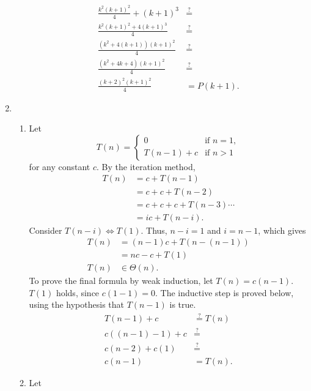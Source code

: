 \documentclass[12pt]{article}
\begin{document}
\begin{enumerate}
\begin{enumerate}
\begin{align*}
            \frac{k^{2} (k + 1)^{2}}{4} + (k + 1)^{3} &\stackrel{?}{=} \\
            \frac{k^{2} (k + 1)^{2} + 4(k + 1)^{3}}{4} &\stackrel{?}{=} \\
            \frac{(k^{2} + 4(k + 1))(k + 1)^{2}}{4} &\stackrel{?}{=} \\
            \frac{(k^{2} + 4k + 4)(k + 1)^{2}}{4} &\stackrel{?}{=} \\
            \frac{(k + 2)^{2}(k + 1)^{2}}{4} &= P(k + 1).
        \end{align*}
    \end{enumerate}
    \item
    \begin{enumerate}
        \item Let \[
            T(n) = \begin{cases}
                0 &\text{if } n = 1, \\
                T(n - 1) + c &\text{if } n > 1
            \end{cases}
        \] for any constant $c$. By the iteration method,
        \begin{align*}
            T(n) &= c + T(n - 1) \\
            &= c + c + T(n - 2) \\
            &= c + c + c + T(n - 3) \cdots \\
            &= ic + T(n - i).
        \end{align*}
        Consider $T(n - i) \Leftrightarrow T(1)$. Thus, $n - i = 1$ and $i = n - 1$, which gives
        \begin{align*}
            T(n) &= (n - 1)c + T(n - (n - 1)) \\
            &= nc - c + T(1) \\
            T(n) &\in \Theta(n).
        \end{align*}
        To prove the final formula by weak induction, let $T(n) = c(n - 1)$. $T(1)$ holds, since $c(1 - 1) = 0$. The inductive step is proved below, using the hypothesis that $T(n - 1)$ is true.
        \begin{align*}
            T(n - 1) + c &\stackrel{?}{=} T(n) \\
            c((n - 1) - 1) + c &\stackrel{?}{=} \\
            c(n - 2) + c(1) &\stackrel{?}{=} \\
            c(n - 1) &= T(n).
        \end{align*}
        \item Let \[
\]
\end{enumerate}
\end{enumerate}
\end{document}
